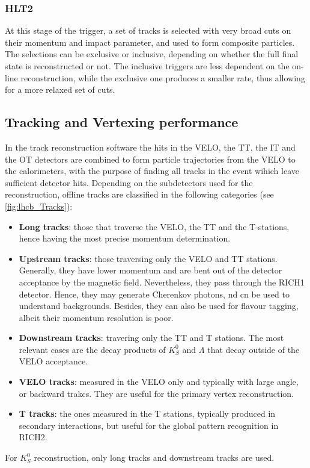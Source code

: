 \subsubsection{HLT2}
At this stage of the trigger, a set of tracks is selected with very broad cuts on their momentum and impact parameter, and used to form composite particles.  The selections can be exclusive or inclusive, depending on whether the full final state is reconstructed or not. The inclusive triggers are less dependent on the on-line reconstruction, while the exclusive one produces a smaller rate, thus allowing for a more relaxed set of cuts.  
\label{sec:HLT2}


\subsection{Tracking and Vertexing performance}
\label{sec:TrackingPerformance}
In the track reconstruction software the hits in the VELO, the TT, the IT and the OT detectors are combined to form particle trajectories from the VELO to the calorimeters, with the purpose of finding all tracks in the event wihich leave sufficient detector hits. Depending on the subdetectors used for the reconstruction, offline tracks are classified in the following categories (see \ref{fig:lhcb_Tracks}): 

\begin{itemize}
\item \textbf{Long tracks}: those that traverse the VELO, the TT and the T-stations, hence having the most precise momentum determination. 
\item \textbf{Upstream tracks}: those traversing only the VELO and TT stations. Generally, they have lower momentum and are bent out of the detector acceptance by the magnetic field. Nevertheless, they pass through the RICH1 detector. Hence, they may generate Cherenkov photons, nd cn be used to understand backgrounds. Besides, they can also be used for flavour tagging, albeit their momentum resolution is poor.
\item \textbf{Downstream tracks}: travering only the TT and T stations. The most relevant cases are the decay products of $K_S^0$ and $\Lambda$ that decay outside of the VELO acceptance. 
\item \textbf{VELO tracks}: measured in the VELO only and typically with large angle, or backward trakcs. They are useful for the primary vertex reconstruction. 
\item \textbf{T tracks}: the ones measured in the T stations, typically produced in secondary interactions, but useful for the global pattern recognition in RICH2. 
\end{itemize}
For $K_S^0$ reconstruction, only long tracks and downstream tracks are used. 

